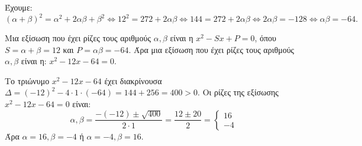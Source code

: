 
\begin{alist}
\item Έχουμε:
\[(\alpha + \beta)^2 = \alpha^2 + 2\alpha\beta + \beta^2 \Leftrightarrow 12^2 = 272 + 2\alpha\beta \Leftrightarrow 144 = 272 + 2\alpha\beta \Leftrightarrow 2\alpha\beta = -128 \Leftrightarrow \alpha\beta = -64.\]
\item Μια εξίσωση που έχει ρίζες τους αριθμούς $\alpha, \beta$ είναι η $x^2 - Sx + P = 0$, όπου
$S = \alpha + \beta = 12$ και $P = \alpha\beta = -64$. Άρα μια εξίσωση που έχει ρίζες τους αριθμούς $\alpha, \beta$ είναι η: $x^2 - 12x - 64 = 0$.

\item Το τριώνυμο $x^2 - 12x - 64$ έχει διακρίνουσα $\Delta = (-12)^2 - 4 \cdot 1 \cdot (-64) = 144 + 256 = 400 > 0$. Οι ρίζες της εξίσωσης $x^2 - 12x - 64 = 0$ είναι:
\[\alpha, \beta = \dfrac{-(-12) \pm \sqrt{400}}{2 \cdot 1} = \dfrac{12 \pm 20}{2} = \begin{cases} 16 \\ -4 \end{cases}\]
Άρα $\alpha = 16, \beta = -4$ ή $\alpha = -4, \beta = 16$.
\end{alist}

